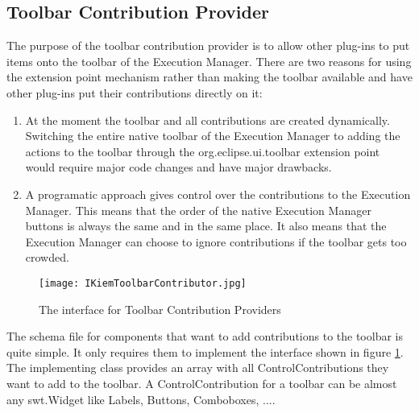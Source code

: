 \subsection{Toolbar Contribution Provider}
\label{section:ToolbarContributionProvider}
The purpose of the toolbar contribution provider is to allow other plug-ins to put
items onto the toolbar of the Execution Manager. 
There are two reasons for using the extension point mechanism
rather than making the toolbar available and have other plug-ins put their
contributions directly on it:
\begin{enumerate}
 \item At the moment the toolbar and all contributions are created dynamically. Switching
the entire native toolbar of the Execution Manager to adding the actions to the toolbar
through the org.eclipse.ui.toolbar extension point would require major code changes and
have major drawbacks.
 \item A programatic approach gives control over the contributions to the Execution Manager.
This means that the order of the native Execution Manager buttons is always the same and in the
same place. It also means that the Execution Manager can choose to ignore contributions if the
toolbar gets too crowded.
\end{enumerate}
\begin{figure}[IToolbarContributor]
  \centering
  \texttt{[image: IKiemToolbarContributor.jpg]}
  \caption[The interface for Toolbar Contribution Providers]%
  {The interface for Toolbar Contribution Providers\protect\footnotemark}
  \label{fig:IToolbarContributor}
\end{figure}

The schema file for components that want to add contributions to the toolbar is quite simple.
It only requires them to implement the interface shown in figure \ref{fig:IToolbarContributor}.
The implementing class provides an array with all ControlContributions they want to add to the toolbar.
A ControlContribution for a toolbar can be almost any swt.Widget like Labels, Buttons, Comboboxes, ....

